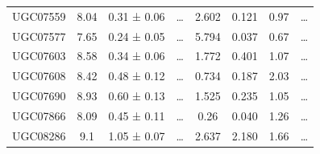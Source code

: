 \documentclass[reprint,%
 amsmath,amssymb,
 aps,
]{revtex4-1}
\begin{document}
\begin{table}[]
\begin{tabular}{cccccrrc}
\rowcolor[HTML]{F3F3F3} 
UGC07559             & 8.04                      & 0.31 ± 0.06           & …                      & 2.602                                                        & 0.121                                                          & 0.97                                                          & …                                                             \\
\rowcolor[HTML]{F3F3F3} 
UGC07577             & 7.65                      & 0.24 ± 0.05           & …                      & 5.794                                                        & 0.037                                                         & 0.67                                                          & …                                                             \\
\rowcolor[HTML]{F3F3F3} 
UGC07603             & 8.58                      & 0.34 ± 0.06           & …                      & 1.772                                                        & 0.401                                                        & 1.07                                                         & …                                                             \\
\rowcolor[HTML]{F3F3F3} 
UGC07608             & 8.42                      & 0.48 ± 0.12           & …                      & 0.734                                                        & 0.187                                                          & 2.03                                                           & …                                                             \\
\rowcolor[HTML]{F3F3F3} 
UGC07690             & 8.93                      & 0.60 ± 0.13           & …                      & 1.525                                                        & 0.235                                                         & 1.05                                                           & …                                                             \\
\rowcolor[HTML]{F3F3F3} 
UGC07866             & 8.09                      & 0.45 ± 0.11           & …                      & 0.26                                                         & 0.040                                                        & 1.26                                                            & …                                                             \\
\rowcolor[HTML]{F3F3F3} 
UGC08286             & 9.1                       & 1.05 ± 0.07           & …                      & 2.637                                                        & 2.180                                                            & 1.66                                                           & …                                                             \\

\end{tabular}
\end{table}
\end{document}
